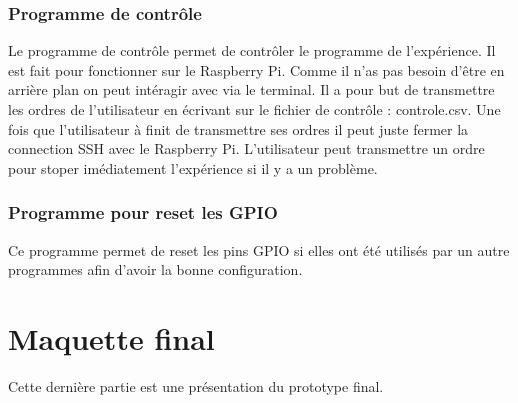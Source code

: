 \documentclass[a4paper, 11pt]{article}
\begin{document}
\subsubsection{Programme de contrôle}
Le programme de contrôle permet de contrôler le programme de l'expérience. Il est fait pour fonctionner sur le Raspberry Pi.
Comme il n'as pas besoin d'être en arrière plan on peut intéragir avec via le terminal.
Il a pour but de transmettre les ordres de l'utilisateur en écrivant sur le fichier de contrôle : controle.csv.
Une fois que l'utilisateur à finit de transmettre ses ordres il peut juste fermer la connection SSH avec le Raspberry Pi.
L'utilisateur peut transmettre un ordre pour stoper imédiatement l'expérience si il y a un problème.
\subsubsection{Programme pour reset les GPIO}
Ce programme permet de reset les pins GPIO si elles ont été utilisés par un autre programmes afin d'avoir la bonne configuration.
\newpage
\section{Maquette final}
Cette dernière partie est une présentation du prototype final.
\end{document}

